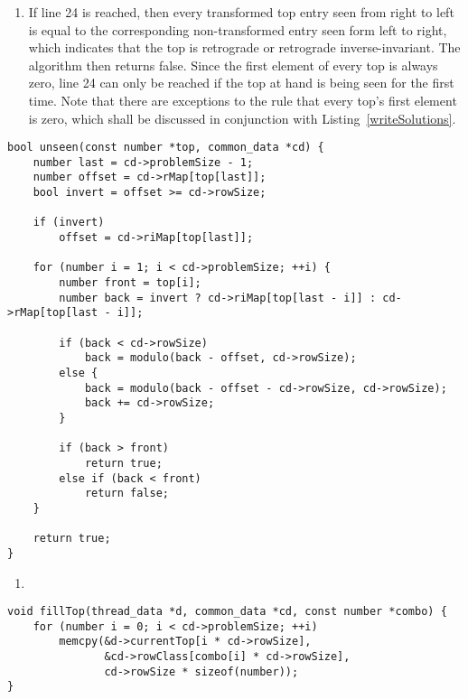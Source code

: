 \begin{enumerate}
\addtocounter{enumi}{3}
\item If line 24 is reached, then every transformed top entry seen from right to left is equal to the corresponding non-transformed entry seen form left to right, which indicates that the top is retrograde or retrograde inverse-invariant. The algorithm then returns false. Since the first element of every top is always zero, line 24 can only be reached if the top at hand is being seen for the first time. Note that there are exceptions to the rule that every top's first element is zero, which shall be discussed in conjunction with Listing~\ref{writeSolutions}.
\end{enumerate}


\begin{lstlisting}[caption={Determining whether a top has not yet been seen for retrograde or retrograde inverse-invariant rows.},label={unseen}]
bool unseen(const number *top, common_data *cd) {
    number last = cd->problemSize - 1;
    number offset = cd->rMap[top[last]];
    bool invert = offset >= cd->rowSize;

    if (invert)
        offset = cd->riMap[top[last]];

    for (number i = 1; i < cd->problemSize; ++i) {
        number front = top[i];
        number back = invert ? cd->riMap[top[last - i]] : cd->rMap[top[last - i]];

        if (back < cd->rowSize)
            back = modulo(back - offset, cd->rowSize);
        else {
            back = modulo(back - offset - cd->rowSize, cd->rowSize);
            back += cd->rowSize;
        }

        if (back > front)
            return true;
        else if (back < front)
            return false;
    }

    return true;
}
\end{lstlisting}

\begin{enumerate}
\addtocounter{enumi}{1}
\item 
\end{enumerate}

\begin{lstlisting}[caption={Refreshing the top row scratch area.},label={fillTop}]
void fillTop(thread_data *d, common_data *cd, const number *combo) {
    for (number i = 0; i < cd->problemSize; ++i)
        memcpy(&d->currentTop[i * cd->rowSize],
               &cd->rowClass[combo[i] * cd->rowSize],
               cd->rowSize * sizeof(number));
}
\end{lstlisting}

